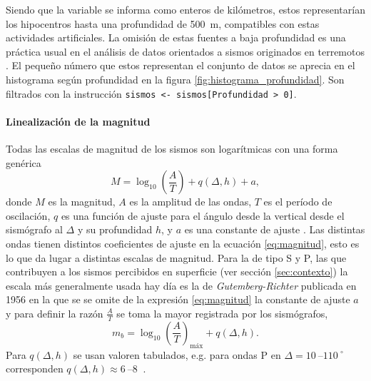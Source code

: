 \documentclass[a4paper]{report}
\begin{document}
Siendo que la variable se informa como enteros de kilómetros, estos representarían los hipocentros hasta una profundidad de \SI{500}{\metre}, compatibles con estas actividades artificiales.
La omisión de estas fuentes a baja profundidad es una práctica usual en el análisis de datos orientados a sismos originados en terremotos \cite{hu_applying_2024}.
El pequeño número que estos representan  el conjunto de datos se aprecia en el histograma según profundidad en la figura \ref{fig:histograma_profundidad}.
Son filtrados con la instrucción \verb'sismos <- sismos[Profundidad > 0]'.



\paragraph{Linealización de la magnitud}
Todas las escalas de magnitud de los sismos son logarítmicas con una forma genérica
\begin{equation}
	M = \log_{10} \left( \frac{A}{T} \right) + q(\Delta, h) + a,
	\label{eq:magnitud}
\end{equation}
donde \(M\) es la magnitud, \(A\) es la amplitud de las ondas, \(T\) es el período de oscilación, \(q\) es una función de ajuste para el ángulo desde la vertical desde el sismógrafo al \(\Delta\) y su profundidad \(h\), y \(a\) es una constante de ajuste \cite[ecuación 4.13]{fowler_solid_1990}.
Las distintas ondas tienen distintos coeficientes de ajuste en la ecuación \ref{eq:magnitud}, esto es lo que da lugar a distintas escalas de magnitud.
Para la de tipo S y P, las que contribuyen a los sismos percibidos en superficie (ver sección \ref{sec:contexto}) la escala más generalmente usada hay día es la de \emph{Gutemberg-Richter} publicada en 1956 \cite[ecuación 4.18]{fowler_solid_1990} en la que se se omite de la expresión \ref{eq:magnitud} la constante de ajuste \(a\) y para definir la razón \(\frac{A}{T}\) se toma la mayor registrada por los sismógrafos,
\begin{equation}
	m_b = \log_{10} \left( \frac{A}{T} \right)_\text{máx} + q(\Delta, h).
	\label{eq:richter}
\end{equation}
Para \(q(\Delta, h)\) se usan valoren tabulados, e.g. para ondas P en \(\Delta = \SIrange{10}{110}{} ^\circ\) corresponden \(q(\Delta, h) \approx \SIrange{6}{8}{}\) \cite{willian_l_ellsworth_earthquake_1991}.
\end{document}
